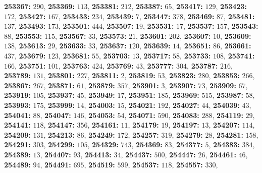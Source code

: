 \textsf{\bfseries 253367:} $290$, \textsf{\bfseries 253369:} $113$, \textsf{\bfseries 253381:} $212$, \textsf{\bfseries 253387:} $65$, \textsf{\bfseries 253417:} $129$, \textsf{\bfseries 253423:} $172$, \textsf{\bfseries 253427:} $167$, \textsf{\bfseries 253433:} $234$, \textsf{\bfseries 253439:} $7$, \textsf{\bfseries 253447:} $378$, \textsf{\bfseries 253469:} $87$, \textsf{\bfseries 253481:} $137$, \textsf{\bfseries 253493:} $173$, \textsf{\bfseries 253501:} $444$, \textsf{\bfseries 253507:} $19$, \textsf{\bfseries 253531:} $17$, \textsf{\bfseries 253537:} $157$, \textsf{\bfseries 253543:} $88$, \textsf{\bfseries 253553:} $115$, \textsf{\bfseries 253567:} $33$, \textsf{\bfseries 253573:} $21$, \textsf{\bfseries 253601:} $202$, \textsf{\bfseries 253607:} $10$, \textsf{\bfseries 253609:} $138$, \textsf{\bfseries 253613:} $29$, \textsf{\bfseries 253633:} $33$, \textsf{\bfseries 253637:} $120$, \textsf{\bfseries 253639:} $14$, \textsf{\bfseries 253651:} $86$, \textsf{\bfseries 253661:} $437$, \textsf{\bfseries 253679:} $123$, \textsf{\bfseries 253681:} $55$, \textsf{\bfseries 253703:} $13$, \textsf{\bfseries 253717:} $58$, \textsf{\bfseries 253733:} $108$, \textsf{\bfseries 253741:} $166$, \textsf{\bfseries 253751:} $101$, \textsf{\bfseries 253763:} $424$, \textsf{\bfseries 253769:} $43$, \textsf{\bfseries 253777:} $304$, \textsf{\bfseries 253787:} $216$, \textsf{\bfseries 253789:} $131$, \textsf{\bfseries 253801:} $227$, \textsf{\bfseries 253811:} $2$, \textsf{\bfseries 253819:} $53$, \textsf{\bfseries 253823:} $280$, \textsf{\bfseries 253853:} $266$, \textsf{\bfseries 253867:} $267$, \textsf{\bfseries 253871:} $61$, \textsf{\bfseries 253879:} $357$, \textsf{\bfseries 253901:} $3$, \textsf{\bfseries 253907:} $73$, \textsf{\bfseries 253909:} $67$, \textsf{\bfseries 253919:} $105$, \textsf{\bfseries 253937:} $45$, \textsf{\bfseries 253949:} $17$, \textsf{\bfseries 253951:} $185$, \textsf{\bfseries 253969:} $515$, \textsf{\bfseries 253987:} $58$, \textsf{\bfseries 253993:} $175$, \textsf{\bfseries 253999:} $14$, \textsf{\bfseries 254003:} $15$, \textsf{\bfseries 254021:} $192$, \textsf{\bfseries 254027:} $44$, \textsf{\bfseries 254039:} $43$, \textsf{\bfseries 254041:} $88$, \textsf{\bfseries 254047:} $146$, \textsf{\bfseries 254053:} $54$, \textsf{\bfseries 254071:} $590$, \textsf{\bfseries 254083:} $288$, \textsf{\bfseries 254119:} $29$, \textsf{\bfseries 254141:} $118$, \textsf{\bfseries 254147:} $356$, \textsf{\bfseries 254161:} $11$, \textsf{\bfseries 254179:} $19$, \textsf{\bfseries 254197:} $13$, \textsf{\bfseries 254207:} $114$, \textsf{\bfseries 254209:} $131$, \textsf{\bfseries 254213:} $86$, \textsf{\bfseries 254249:} $172$, \textsf{\bfseries 254257:} $319$, \textsf{\bfseries 254279:} $28$, \textsf{\bfseries 254281:} $158$, \textsf{\bfseries 254291:} $303$, \textsf{\bfseries 254299:} $105$, \textsf{\bfseries 254329:} $743$, \textsf{\bfseries 254369:} $83$, \textsf{\bfseries 254377:} $5$, \textsf{\bfseries 254383:} $384$, \textsf{\bfseries 254389:} $13$, \textsf{\bfseries 254407:} $93$, \textsf{\bfseries 254413:} $34$, \textsf{\bfseries 254437:} $500$, \textsf{\bfseries 254447:} $26$, \textsf{\bfseries 254461:} $46$, \textsf{\bfseries 254489:} $94$, \textsf{\bfseries 254491:} $695$, \textsf{\bfseries 254519:} $599$, \textsf{\bfseries 254537:} $118$, \textsf{\bfseries 254557:} $330$, 

